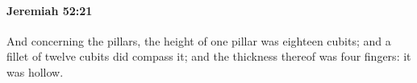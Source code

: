
		\paragraph{Jeremiah 52:21} %
			\label{JEREMIAH-52-21}

			And concerning the pillars, the height of one pillar was eighteen cubits; and a fillet of twelve cubits did compass it; and the thickness thereof was four fingers: it was hollow.



